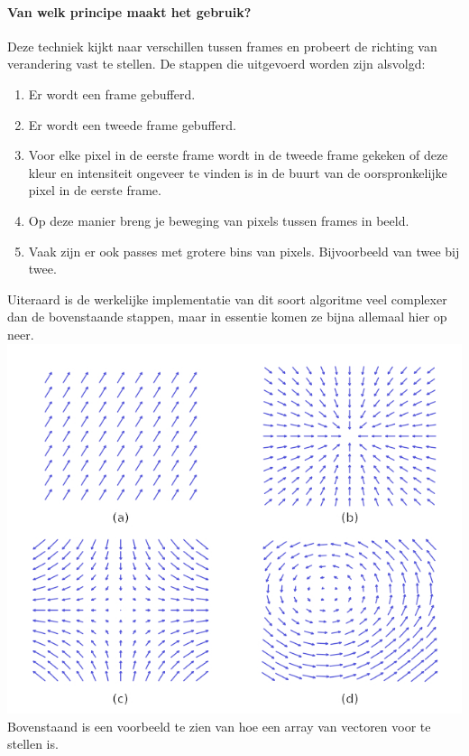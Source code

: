 \documentclass[11pt]{article}
\begin{document}
    \paragraph{Van welk principe maakt het gebruik?}
    Deze techniek kijkt naar verschillen tussen frames en probeert de richting van verandering vast te stellen.
    De stappen die uitgevoerd worden zijn alsvolgd:
    \begin{enumerate}
        \item Er wordt een frame gebufferd.
        \item Er wordt een tweede frame gebufferd.
        \item Voor elke pixel in de eerste frame wordt in de tweede frame gekeken of deze kleur en intensiteit ongeveer te vinden is in de buurt van de oorspronkelijke pixel in de eerste frame.
        \item Op deze manier breng je beweging van pixels tussen frames in beeld.
        \item Vaak zijn er ook passes met grotere bins van pixels. Bijvoorbeeld van twee bij twee.
    \end{enumerate}
    Uiteraard is de werkelijke implementatie van dit soort algoritme veel complexer dan de bovenstaande stappen, maar in essentie komen ze bijna allemaal hier op neer.
    \newline
    \includegraphics[height=0.2\textheight]{Images/Vector-field-examples.jpg}
    \newline
    Bovenstaand is een voorbeeld te zien van hoe een array van vectoren voor te stellen is. 
\end{document}
